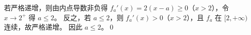 若严格递增，则由内点导数非负得 $f_a'(x)=2(x-a)\ge0$（$x>2$），令 $x\to2^+$ 得 $a\le2$。
反之，若 $a\le2$，则 $f_a'(x)>0$（$x>2$），且 $f_a$ 在 $[2,+\infty)$ 连续，故严格递增。
因此 $\boxed{a\le2}$。\qed
